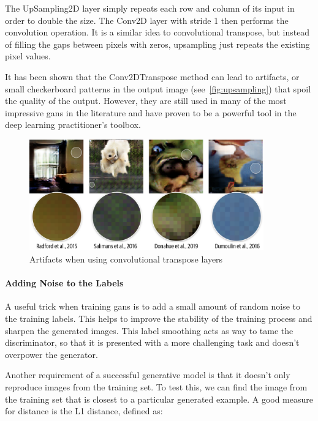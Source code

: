 The UpSampling2D layer simply repeats each row and column of its input in order to double the size.
The Conv2D layer with stride 1 then performs the convolution operation.
It is a similar idea to convolutional transpose, but instead of filling the gaps between pixels with zeros, upsampling just repeats the existing pixel values.

It has been shown that the Conv2DTranspose method can lead to artifacts, or small checkerboard patterns in the output image (see~\autoref{fig:upsampling}) that spoil the quality of the output.
However, they are still used in many of the most impressive \glspl{gan}  in the literature and have proven to be a powerful tool in the deep learning practitioner’s toolbox.

\begin{figure}
	\begin{center}
		\includegraphics[width=0.9\textwidth]{figures/upsampling}
	\end{center}
	\caption{Artifacts when using convolutional transpose layers}\label{fig:upsampling}
\end{figure}

\paragraph{Adding Noise to the Labels}

A useful trick when training \glspl{gan}  is to add a small amount of random noise to the training labels.
This helps to improve the stability of the training process and sharpen the generated images.
This label smoothing acts as way to tame the discriminator, so that it is presented with a more challenging task and doesn’t overpower the generator.

Another requirement of a successful generative model is that it doesn’t only reproduce images from the training set.
To test this, we can find the image from the training set that is closest to a particular generated example. A good measure for distance is the L1 distance, defined as:

